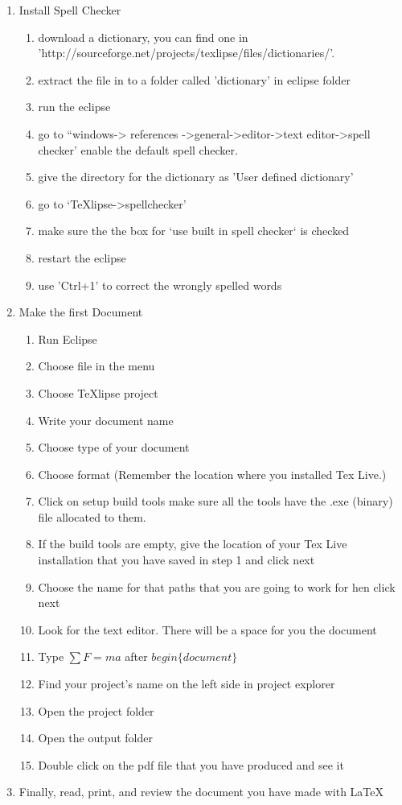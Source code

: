 \documentclass{memoir}
\begin{document}
\begin{enumerate}
  \item Install Spell Checker
  \begin{enumerate}
    \item download a dictionary, you can find one in
    'http://sourceforge.net/projects/texlipse/files/dictionaries/'.
    \item extract the file in to a folder called 'dictionary' in eclipse folder
    \item run the eclipse
    \item go to ``windows-> references ->general->editor->text editor->spell
    checker' enable the default spell checker.
    \item give the directory for the dictionary as 'User defined dictionary'
    \item go to `TeXlipse->spellchecker'
    \item make sure the the box for `use built in spell checker` is checked
    \item restart the eclipse
    \item use 'Ctrl+1' to correct the wrongly spelled words
  \end{enumerate}  
  
  \item Make the first Document
  \begin{enumerate}
    \item Run Eclipse
    \item Choose file in the menu 
    \item Choose TeXlipse project 
    \item Write your document name
    \item Choose type of your document
    \item Choose format (Remember the location where you installed Tex Live.) 
    \item Click on setup build tools make sure all the tools have the .exe (binary) file allocated to them.
    \item If the build tools are empty, give the location of your Tex Live installation that you have saved in step 1 and click next
    \item Choose the name for that paths that you are going to work for hen click next
	\item Look for the text editor. There will be a space for you the document
    \item Type $\sum F = ma$ after $begin\{document\}$  
    \item Find your project's name on the left side in project explorer
    \item Open the project folder
    \item Open the output folder
    \item Double click on the pdf file that you have produced and see it    
  \end{enumerate}
  
  \item Finally, read, print, and review the document you have made with \LaTeX
\end{enumerate}
\end{document}
